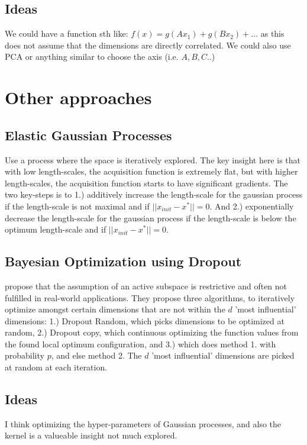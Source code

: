 \subsection{Ideas}
We could have a function sth like:
$f(x) = g(Ax_1) + g(Bx_2) + ...$
as this does not assume that the dimensions are directly correlated.
We could also use PCA or anything similar to choose the axis (i.e. $A, B, C$..)


\section{Other approaches}

\subsection{Elastic Gaussian Processes}
\citep{Rana2017} Use a process where the space is iteratively explored.
The key insight here is that with low length-scales, the acquisition function is extremely flat, but with higher length-scales, the acquisition function starts to have significant gradients.
The two key-steps is to 1.) additively increase the length-scale for the gaussian process if the length-scale is not maximal and if $|| x_{init} - x^* || = 0$.
And 2.) exponentially decrease the length-scale for the gaussian process if the length-scale is below the optimum length-scale and if $|| x_{init} - x^* || = 0$.

\subsection{Bayesian Optimization using Dropout}
\citep{Li2018} propose that the assumption of an active subspace is restrictive and often not fulfilled in real-world applications.
They propose three algorithms, to iteratively optimize amongst certain dimensions that are not within the $d$ 'most influential' dimensions: 1.) Dropout Random, which picks dimensions to be optimized at random, 2.) Dropout copy, which continuous optimizing the function values from the found local optimum configuration, and 3.) which does method 1. with probability $p$, and else method 2.
The $d$ 'most influential' dimensions are picked at random at each iteration.


\subsection{Ideas}
I think optimizing the hyper-parameters of Gaussian processes, and also the kernel is a valueable insight not much explored.



